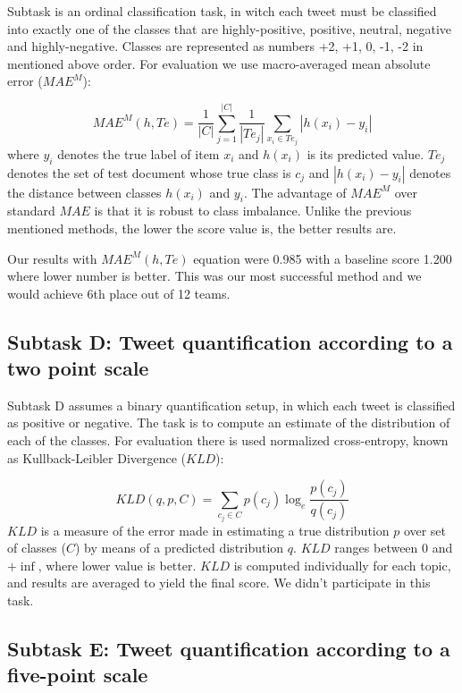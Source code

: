 \documentclass[runningheads,a4paper]{llncs}
\begin{document}
Subtask is an ordinal classification task, in witch each tweet must be classified into exactly one of the classes that are highly-positive, positive, neutral, negative and highly-negative. Classes are represented as numbers {+2, +1, 0, -1, -2} in mentioned above order. For evaluation we use macro-averaged mean absolute error ($MAE^M$):

\begin{equation}
MAE^M(h, Te) = \frac{1}{|C|}\sum_{j=1}^{|C|}\frac{1}{|Te_j|}\sum_{x_i\in Te_j}|h(x_i) - y_i|
\end{equation}
where $y_i$ denotes the true label of item $x_i$ and $h(x_i)$ is its predicted value. $Te_j$ denotes the set of test document whose true class is $c_j$ and $|h(x_i) - y_i|$ denotes the distance between classes $h(x_i)$ and $y_i$. The advantage of $MAE^M$ over standard $MAE$ is that it is robust to class imbalance. Unlike the previous mentioned methods, the lower the score value is, the better results are. 

Our results with $MAE^M(h, Te)$ equation were 0.985 with a baseline score 1.200 where lower number is better. This was our most successful method and we would achieve 6th place out of 12 teams.

\subsection{Subtask D: Tweet quantification according to a two point scale}

Subtask D assumes a binary quantification setup, in which each tweet is classified as positive or negative. The task is to compute an estimate of the distribution of each of the classes. For evaluation there is used normalized cross-entropy, known as Kullback-Leibler Divergence ($KLD$):

\begin{equation}
KLD(q, p, C) = \sum_{c_j \in C}p(c_j)\log_e\frac{p(c_j)}{q(c_j)}
\end{equation}
$KLD$ is a measure of the error made in estimating a true distribution $p$ over set of classes ($C$) by means of a predicted distribution $q$. $KLD$ ranges between 0 and $+\inf$, where lower value is better. $KLD$ is computed individually for each topic, and results are averaged to yield the final score. We didn't participate in this task.

\subsection{Subtask E: Tweet quantification according to a five-point scale}
\end{document}
